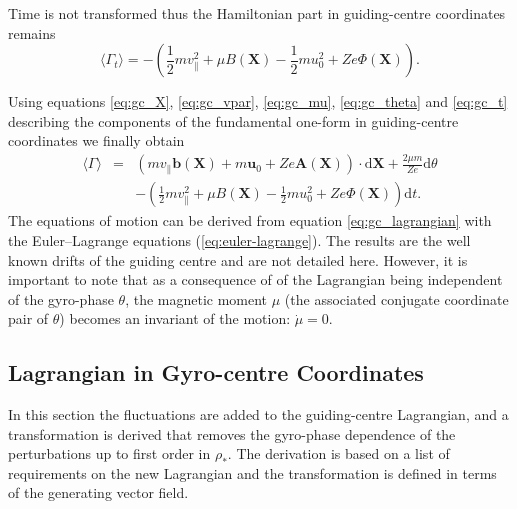 \documentclass[a4paper,10pt]{article}
\renewcommand{\vec}[1]{\mathbf{#1}}
\begin{document}
Time is not transformed thus the Hamiltonian part in guiding-centre coordinates remains
\begin{equation}
	\langle \Gamma_t \rangle = -\left( \frac{1}{2} m v_{\parallel}^2 + \mu B(\mathbf{X}) - \frac{1}{2} m u_0^2 + Z e \Phi(\mathbf{X}) \right).
	\label{eq:gc_t}
\end{equation}

Using equations \ref{eq:gc_X}, \ref{eq:gc_vpar}, \ref{eq:gc_mu}, \ref{eq:gc_theta} and \ref{eq:gc_t} describing the components of the fundamental one-form in guiding-centre coordinates we finally obtain
\begin{eqnarray}
	\langle \Gamma \rangle &=& \left( m v_{\parallel} \mathbf{b}(\mathbf{X}) + m \vec{u}_0 + Z e \mathbf{A}(\mathbf{X}) \right) \cdot \mathrm{d}\mathbf{X} + \frac{2 \mu m}{Z e} \mathrm{d} \theta \nonumber \\ 
	&& - \left( \frac{1}{2} m v_{\parallel}^2 + \mu B(\mathbf{X}) - \frac{1}{2} m u_0^2 + Z e \Phi(\mathbf{X}) \right) \mathrm{d}t.
	\label{eq:gc_lagrangian}
\end{eqnarray}
The equations of motion can be derived from equation \ref{eq:gc_lagrangian} with the Euler--Lagrange equations (\ref{eq:euler-lagrange}). The results are the well known drifts of the guiding centre and are not detailed here. However, it is important to note that as a consequence of of the Lagrangian being independent of the gyro-phase $\theta$, the magnetic moment $\mu$ (the associated conjugate coordinate pair of $\theta$) becomes an invariant of the motion: $\dot{\mu}=0$.

\subsection{Lagrangian in Gyro-centre Coordinates} \label{sec:gyro}
In this section the fluctuations are added to the guiding-centre Lagrangian, and a transformation is derived that removes the gyro-phase dependence of the perturbations up to first order in $\rho_*$. The derivation is based on a list of requirements on the new Lagrangian and the transformation is defined in terms of the generating vector field. 

\end{document}

